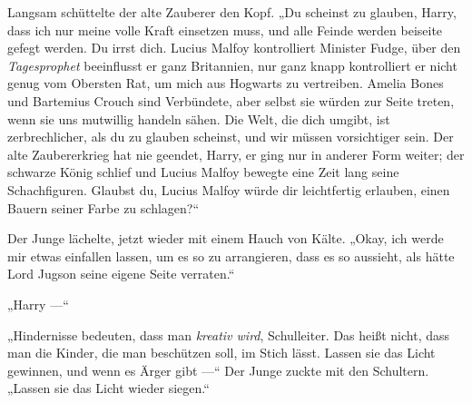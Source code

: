 Langsam schüttelte der alte Zauberer den Kopf.
„Du scheinst zu glauben, Harry, dass ich nur meine volle Kraft einsetzen muss, und alle Feinde werden beiseite gefegt werden. Du irrst dich. Lucius Malfoy kontrolliert Minister Fudge, über den \emph{Tagesprophet} beeinflusst er ganz Britannien, nur ganz knapp kontrolliert er nicht genug vom Obersten Rat, um mich aus Hogwarts zu vertreiben. Amelia Bones und Bartemius Crouch sind Verbündete, aber selbst sie würden zur Seite treten, wenn sie uns mutwillig handeln sähen. Die Welt, die dich umgibt, ist zerbrechlicher, als du zu glauben scheinst, und wir müssen vorsichtiger sein. Der alte Zaubererkrieg hat nie geendet, Harry, er ging nur in anderer Form weiter; der schwarze König schlief und Lucius Malfoy bewegte eine Zeit lang seine Schachfiguren. Glaubst du, Lucius Malfoy würde dir leichtfertig erlauben, einen Bauern seiner Farbe zu schlagen?“

Der Junge lächelte, jetzt wieder mit einem Hauch von Kälte.
„Okay, ich werde mir etwas einfallen lassen, um es so zu arrangieren, dass es so aussieht, als hätte Lord Jugson seine eigene Seite verraten.“

„Harry —“

„Hindernisse bedeuten, dass man \emph{kreativ wird}, Schulleiter. Das heißt nicht, dass man die Kinder, die man beschützen soll, im Stich lässt. Lassen sie das Licht gewinnen, und wenn es Ärger gibt —“ Der Junge zuckte mit den Schultern.
„Lassen sie das Licht wieder siegen.“

